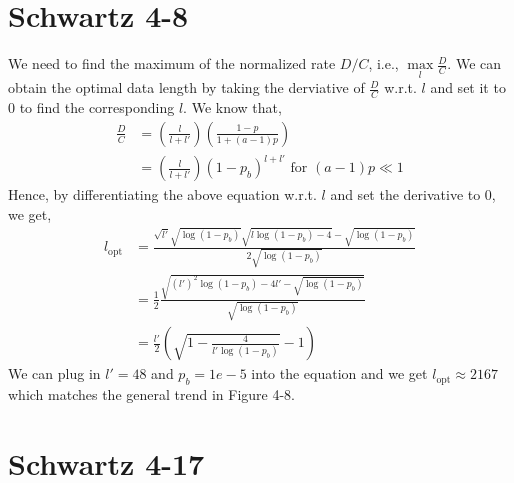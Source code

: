 \documentclass{article}
\begin{document}
\section*{Schwartz 4-8}
	We need to find the maximum of the normalized rate $D/C$, i.e., $\max\limits_{l}\frac{D}{C}$.
	We can obtain the optimal data length by taking the derviative of $\frac{D}{C}$
	w.r.t. $l$ and set it to 0 to find the corresponding $l$. We know that,
	\begin{align*}
		\frac{D}{C} &= (\frac{l}{l+l'})(\frac{1-p}{1 + (a-1)p}) \\
		&= (\frac{l}{l+l'})(1-p_b)^{l+l'} \text{ for } (a-1)p \ll 1
	\end{align*}
	Hence, by differentiating the above equation w.r.t. $l$ and set the derivative
	to 0, we get,
	\begin{align*}
		l_{\text{opt}} &= \frac{\sqrt{l'} \sqrt{\log{(1-p_{b})}} \sqrt{l\log{(1-p_{b})} - 4} - \sqrt{\log{(1-p_{b})}}}{2 \sqrt{\log{(1-p_{b})}}} \\
		&= \frac{1}{2} \frac{\sqrt{(l')^{2} \log{(1-p_{b})} - 4l' - \sqrt{\log{(1-p_{b})}}}}{\sqrt{\log{(1-p_{b})}}} \\
		&= \frac{l'}{2} ( \sqrt{1 - \frac{4}{l' \log{(1-p_{b})}}} - 1)
	\end{align*}
	We can plug in $l' = 48$ and $p_{b} = 1e-5$ into the equation and we get
	$l_{\text{opt}} \approx 2167$ which matches the general trend in Figure 4-8.

\section*{Schwartz 4-17}
\end{document}
